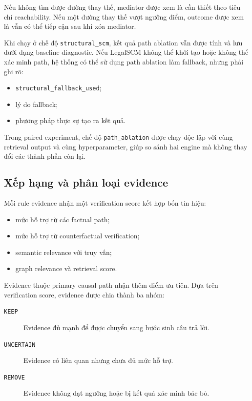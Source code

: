 Nếu không tìm được đường thay thế, mediator được xem là cần thiết theo tiêu
chí reachability. Nếu một đường thay thế vượt ngưỡng điểm, outcome được xem
là vẫn có thể tiếp cận sau khi xóa mediator.

Khi chạy ở chế độ \texttt{structural\_scm}, kết quả path ablation vẫn được
tính và lưu dưới dạng baseline diagnostic. Nếu LegalSCM không thể khởi tạo
hoặc không thể xác minh path, hệ thống có thể sử dụng path ablation làm
fallback, nhưng phải ghi rõ:

\begin{itemize}
    \item \texttt{structural\_fallback\_used};
    \item lý do fallback;
    \item phương pháp thực sự tạo ra kết quả.
\end{itemize}

Trong paired experiment, chế độ \texttt{path\_ablation} được chạy độc lập
với cùng retrieval output và cùng hyperparameter, giúp so sánh hai engine mà
không thay đổi các thành phần còn lại.

\subsection{Xếp hạng và phân loại evidence}

Mỗi rule evidence nhận một verification score kết hợp bốn tín hiệu:

\begin{itemize}
    \item mức hỗ trợ từ các factual path;
    \item mức hỗ trợ từ counterfactual verification;
    \item semantic relevance với truy vấn;
    \item graph relevance và retrieval score.
\end{itemize}

Evidence thuộc primary causal path nhận thêm điểm ưu tiên. Dựa trên
verification score, evidence được chia thành ba nhóm:

\begin{description}
    \item[\texttt{KEEP}] Evidence đủ mạnh để được chuyển sang bước sinh câu
    trả lời.

    \item[\texttt{UNCERTAIN}] Evidence có liên quan nhưng chưa đủ mức hỗ trợ.

    \item[\texttt{REMOVE}] Evidence không đạt ngưỡng hoặc bị kết quả xác
    minh bác bỏ.
\end{description}

